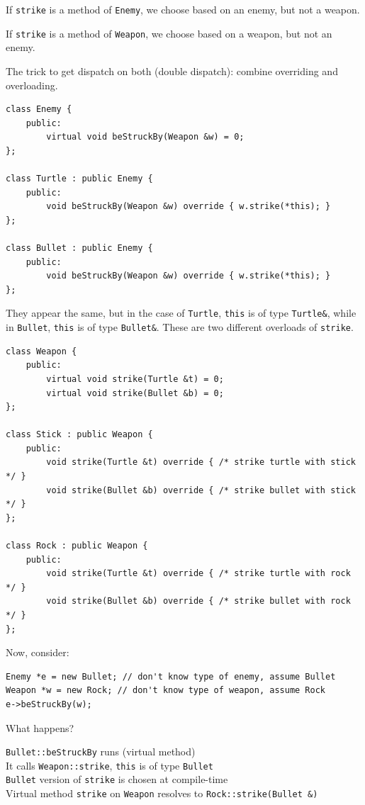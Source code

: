 \documentclass[11pt]{article}
\theoremstyle{definition}
\begin{document}
If {\tt strike} is a method of {\tt Enemy}, we choose based on an enemy, but not a weapon.

If {\tt strike} is a method of {\tt Weapon}, we choose based on a weapon, but not an enemy.

The trick to get dispatch on both (double dispatch): combine overriding and overloading.
\begin{lstlisting}
class Enemy {
    public:
        virtual void beStruckBy(Weapon &w) = 0;
};

class Turtle : public Enemy {
    public:
        void beStruckBy(Weapon &w) override { w.strike(*this); }
};

class Bullet : public Enemy {
    public:
        void beStruckBy(Weapon &w) override { w.strike(*this); }
};
\end{lstlisting}
\vspace{-0.25cm}
They appear the same, but in the case of {\tt Turtle}, {\tt *this} is of type {\tt Turtle\&}, while in {\tt Bullet}, {\tt *this} is of type {\tt Bullet\&}. These are two different overloads of {\tt strike}.
\newpage
\begin{lstlisting}
class Weapon {
    public:
        virtual void strike(Turtle &t) = 0;
        virtual void strike(Bullet &b) = 0;
};

class Stick : public Weapon {
    public:
        void strike(Turtle &t) override { /* strike turtle with stick */ }
        void strike(Bullet &b) override { /* strike bullet with stick */ }
};

class Rock : public Weapon {
    public:
        void strike(Turtle &t) override { /* strike turtle with rock */ }
        void strike(Bullet &b) override { /* strike bullet with rock */ }
};
\end{lstlisting}
\vspace{-0.25cm}
Now, consider:
\begin{lstlisting}
Enemy *e = new Bullet; // don't know type of enemy, assume Bullet
Weapon *w = new Rock; // don't know type of weapon, assume Rock
e->beStruckBy(w);
\end{lstlisting}
\vspace{-0.25cm}
What happens?

{\tt Bullet::beStruckBy} runs (virtual method) \\
It calls {\tt Weapon::strike}, {\tt *this} is of type {\tt Bullet} \\
{\tt Bullet} version of {\tt strike} is chosen at compile-time \\
Virtual method {\tt strike} on {\tt Weapon} resolves to {\tt Rock::strike(Bullet \&)}
\end{document}
